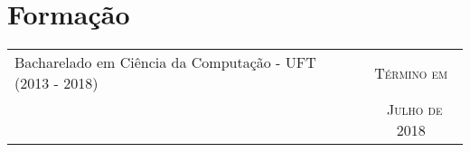 \section{Formação}

\begin{tabular}{p{11cm}|c}
  Bacharelado em Ciência da Computação - UFT (2013 - 2018) & \textsc{Término em} \\
                                                                                                              & \textsc{\ Julho de 2018} \\
\end{tabular}\\
